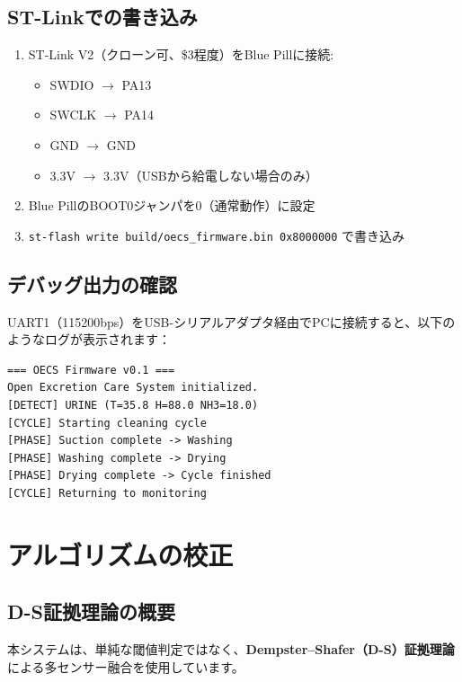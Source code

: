 \documentclass[a4paper,11pt]{article}
\begin{document}
\subsection{ST-Linkでの書き込み}

\begin{enumerate}[leftmargin=2em]
  \item ST-Link V2（クローン可、\$3程度）をBlue Pillに接続:
    \begin{itemize}
      \item SWDIO $\to$ PA13
      \item SWCLK $\to$ PA14
      \item GND $\to$ GND
      \item 3.3V $\to$ 3.3V（USBから給電しない場合のみ）
    \end{itemize}
  \item Blue PillのBOOT0ジャンパを0（通常動作）に設定
  \item \texttt{st-flash write build/oecs\_firmware.bin 0x8000000} で書き込み
\end{enumerate}

\subsection{デバッグ出力の確認}

UART1（115200bps）をUSB-シリアルアダプタ経由でPCに接続すると、以下のようなログが表示されます：

\begin{lstlisting}
=== OECS Firmware v0.1 ===
Open Excretion Care System initialized.
[DETECT] URINE (T=35.8 H=88.0 NH3=18.0)
[CYCLE] Starting cleaning cycle
[PHASE] Suction complete -> Washing
[PHASE] Washing complete -> Drying
[PHASE] Drying complete -> Cycle finished
[CYCLE] Returning to monitoring
\end{lstlisting}

\newpage
\section{アルゴリズムの校正}

\subsection{D-S証拠理論の概要}

本システムは、単純な閾値判定ではなく、\textbf{Dempster--Shafer（D-S）証拠理論}による多センサー融合を使用しています。
\end{document}
